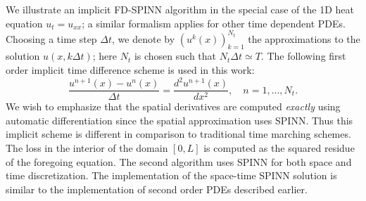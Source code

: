 \documentclass[12pt]{article}
\begin{document}
We illustrate an implicit FD-SPINN algorithm in the special case of the 1D heat equation $u_t = u_{xx}$; a similar formalism applies for other time dependent PDEs. Choosing a time step $\Delta t$, we denote by $(u^k(x))_{k=1}^{N_t}$ the approximations to the solution $u(x, k\Delta t)$; here $N_t$ is chosen such that $N_t \Delta t \simeq T$. The following first order implicit time difference scheme is used in this work:
\begin{displaymath}
\frac{u^{n+1}(x) - u^n(x)}{\Delta t} = \frac{d^2 u^{n+1}(x)}{d x^2}, \quad n = 1, \ldots, N_t.
\end{displaymath}
We wish to emphasize that the spatial derivatives are computed \emph{exactly} using automatic differentiation since the spatial approximation uses SPINN. Thus this implicit scheme is different in comparison to traditional time marching schemes. The loss in the interior of the domain $[0,L]$ is computed as the squared residue of the foregoing equation. The second algorithm uses SPINN for both space and time discretization. The implementation of the space-time SPINN solution is similar to the implementation of second order PDEs described earlier.
\end{document}
